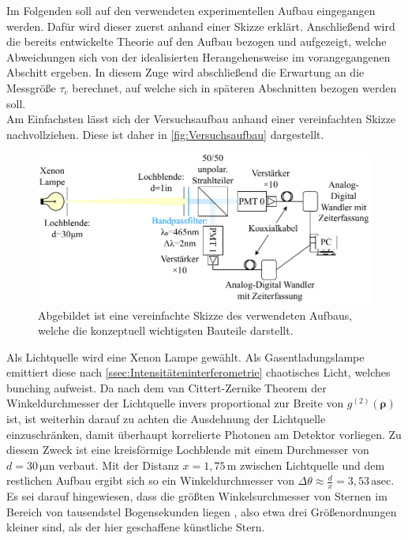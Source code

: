 Im Folgenden soll auf den verwendeten experimentellen Aufbau eingegangen werden. 
Dafür wird dieser zuerst anhand einer Skizze erklärt. 
Anschließend wird die bereits entwickelte Theorie auf den Aufbau bezogen und aufgezeigt, welche Abweichungen sich von der idealisierten Herangehensweise im vorangegangenen Abschitt ergeben. 
In diesem Zuge wird abschließend die Erwartung an die Messgröße $\tau_c$ berechnet, auf welche sich in späteren Abschnitten bezogen werden soll. \\

Am Einfachsten lässt sich der Versuchsaufbau anhand einer vereinfachten Skizze nachvollziehen. Diese ist daher in \autoref{fig:Versuchsaufbau} dargestellt. 
\begin{figure}[htbp]
    \centering
    \includegraphics[width=0.9\linewidth]{images/Aufbau/Aufbau.pdf}
    \caption{Abgebildet ist eine vereinfachte Skizze des verwendeten Aufbaus, welche die konzeptuell wichtigsten Bauteile darstellt.}
    \label{fig:Versuchsaufbau}
\end{figure}
Als Lichtquelle wird eine Xenon Lampe gewählt. 
Als Gasentladungslampe emittiert diese nach \autoref{ssec:Intensitäteninterferometrie} chaotisches Licht, welches bunching aufweist. 
Da nach dem van Cittert-Zernike Theorem der Winkeldurchmesser der Lichtquelle invers proportional zur Breite von $g^{(2)}(\bm{\rho})$ ist, ist weiterhin darauf zu achten die Ausdehnung der Lichtquelle einzuschränken, damit überhaupt korrelierte Photonen am Detektor vorliegen. 
Zu diesem Zweck ist eine kreisförmige Lochblende mit einem Durchmesser von $d=30\,\mathrm{\mu m}$ verbaut. 
Mit der Distanz $x=1,75\,\mathrm{m}$ zwischen Lichtquelle und dem restlichen Aufbau ergibt sich so ein Winkeldurchmesser von $\Delta \theta \approx \frac{d}{x} = 3,53\,\mathrm{asec}$. 
Es sei darauf hingewiesen, dass die größten Winkelsurchmesser von Sternen im Bereich von tausendstel Bogensekunden liegen \cite{hanburybrownAngularDiameters321974}, also etwa drei Größenordnungen kleiner sind, als der hier geschaffene \glqq künstliche Stern\grqq. \\
